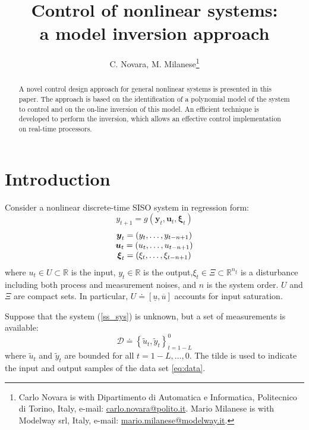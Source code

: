 \documentclass[twocolumn,english,journal]{IEEEtran}
\begin{document}
\title{Control of nonlinear systems:\\
a model inversion approach}


\author{C. Novara, M. Milanese\thanks{Carlo Novara is with Dipartimento di Automatica e Informatica, Politecnico
di Torino, Italy, e-mail: \protect\href{http://carlo.novara@polito.it}{carlo.novara@polito.it}.
Mario Milanese is with Modelway srl, Italy, e-mail: \protect\href{http://mario.milanese@modelway.it}{mario.milanese@modelway.it}.}}
\maketitle
\begin{abstract}
A novel control design approach for general nonlinear systems is presented
in this paper. The approach is based on the identification of a polynomial
model of the system to control and on the on-line inversion of this
model. An efficient technique is developed to perform the inversion,
which allows an effective control implementation on real-time processors.
\end{abstract}

\section{Introduction}

\label{sec:ibc_approach}

Consider a nonlinear discrete-time SISO system in regression form:
\begin{equation}
y_{t+1}=g\left(\boldsymbol{y}_{t},\boldsymbol{u}_{t},\boldsymbol{\xi}_{t}\right)\label{ss_sys}
\end{equation}
\[
\begin{array}[t]{c}
\boldsymbol{y}_{t}=\left(y_{t},\ldots,y_{t-n+1}\right)\\
\boldsymbol{u}_{t}=\left(u_{t},\ldots,u_{t-n+1}\right)\\
\boldsymbol{\xi}_{t}=\left(\xi_{t},\ldots,\xi_{t-n+1}\right)
\end{array}
\]
where $u_{t}\in U\subset\mathbb{R}$ is the input, $y_{t}\in\mathbb{R}$
is the output,$\xi_{t}\in\Xi\subset\mathbb{R}^{n_{\xi}}$ is a disturbance
including both process and measurement noises, and $n$ is the system
order. $U$ and $\Xi$ are compact sets. In particular, $U\doteq[\underline{u},\overline{u}]$
accounts for input saturation.

Suppose that the system (\ref{ss_sys}) is unknown, but a set of measurements
is available:
\begin{equation}
\mathcal{D}\doteq\left\{ \tilde{u}_{t},\tilde{y}_{t}\right\} _{t=1-L}^{0}\label{eq:data}
\end{equation}
where $\tilde{u}_{t}$ and $\tilde{y}_{t}$ are bounded for all $t=1-L,\ldots,0$.
The tilde is used to indicate the input and output samples of the
data set \eqref{eq:data}.
\end{document}
